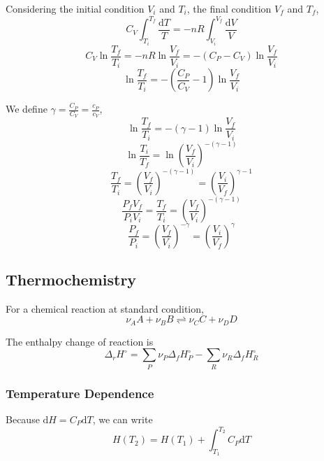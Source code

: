 \documentclass[letterpaper]{article}
\newcommand{\diff}{\mathrm{d}}
\begin{document}
Considering the initial condition $V_i$ and $T_i$, the final condition $V_f$ and $T_f$,
\begin{equation*}
    C_V\int_{T_i}^{T_f}\frac{\diff T}{T}=-nR\int_{V_i}^{V_f}\frac{\diff V}{V}
\end{equation*}
\begin{equation*}
    C_V\ln\frac{T_f}{T_i}=-nR\ln\frac{V_f}{V_i}=-(C_P-C_V)\ln\frac{V_f}{V_i}
\end{equation*}
\begin{equation*}
    \ln\frac{T_f}{T_i}=-\left(\frac{C_P}{C_V}-1\right)\ln\frac{V_f}{V_i}
\end{equation*}

We define $\gamma=\frac{C_P}{C_V}=\frac{c_P}{c_V}$,
\begin{equation*}
    \ln\frac{T_f}{T_i}=-(\gamma-1)\ln\frac{V_f}{V_i}
\end{equation*}
\begin{equation*}
    \ln\frac{T_i}{T_f}=\ln\left(\frac{V_f}{V_i}\right)^{-(\gamma-1)}
\end{equation*}
\begin{equation*}
    \frac{T_f}{T_i}=\left(\frac{V_f}{V_i}\right)^{-(\gamma-1)}=\left(\frac{V_i}{V_f}\right)^{\gamma-1}
\end{equation*}
\begin{equation*}
    \frac{P_fV_f}{P_iV_i}=\frac{T_f}{T_i}=\left(\frac{V_f}{V_i}\right)^{-(\gamma-1)}
\end{equation*}
\begin{equation*}
    \boxed{\frac{P_f}{P_i}=\left(\frac{V_f}{V_i}\right)^{-\gamma}=\left(\frac{V_i}{V_f}\right)^\gamma}
\end{equation*}
\subsection*{Thermochemistry}
For a chemical reaction at standard condition,
\begin{equation*}
    \nu_AA+\nu_BB\rightleftharpoons\nu_CC+\nu_DD
\end{equation*}

The enthalpy change of reaction is
\begin{equation*}
    \Delta_rH^\circ=\sum_P\nu_P\Delta_fH^\circ_P-\sum_R\nu_R\Delta_fH^\circ_R
\end{equation*}

\subsubsection*{Temperature Dependence}
Because $\diff H=C_P\diff T$, we can write
\begin{equation*}
    H(T_2)=H(T_1)+\int_{T_1}^{T_2}C_P\diff T
\end{equation*}
\end{document}

